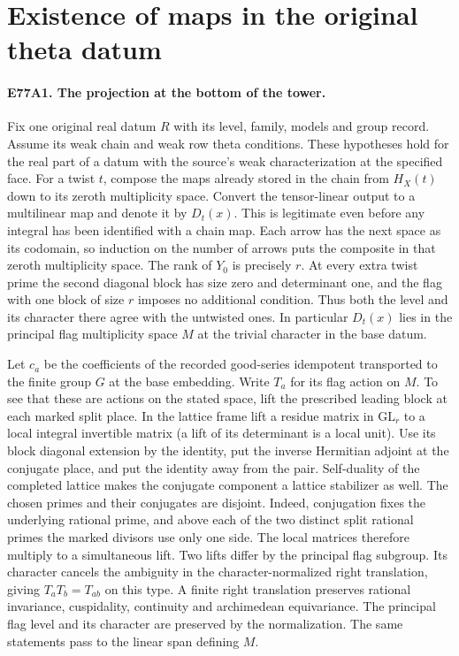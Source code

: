 \section{Existence of maps in the original theta datum}

\paragraph{E77A1. The projection at the bottom of the tower.}
Fix one original real datum $R$ with its level, family, models and
group record. Assume its weak chain and weak row theta conditions.
These hypotheses hold for the real part of a datum with the source's
weak characterization at the specified face. For a twist $t$, compose
the maps already stored in the chain from $H_X(t)$ down to its zeroth
multiplicity space. Convert the tensor-linear output to a multilinear
map and denote it by $D_t(x)$. This is legitimate even before any
integral has been identified with a chain map. Each arrow has the
next space as its codomain, so induction on the number of arrows puts
the composite in that zeroth multiplicity space. The rank of $Y_0$
is precisely $r$. At every extra twist prime the second diagonal
block has size zero and determinant one, and the flag with one block
of size $r$ imposes no additional condition. Thus both the level and
its character there agree with the untwisted ones. In particular
$D_t(x)$ lies in the principal flag multiplicity space $M$ at the
trivial character in the base datum.

Let $c_a$ be the coefficients of the recorded good-series idempotent
transported to the finite group $G$ at the base embedding. Write $T_a$
for its flag action on $M$. To see that these are actions on the stated
space, lift the prescribed leading block at each marked split place.
In the lattice frame lift a residue matrix in $\mathrm{GL}_r$ to a
local integral invertible matrix (a lift of its determinant is a local
unit). Use its block diagonal extension by the identity, put the
inverse Hermitian adjoint at the conjugate place, and put the identity
away from the pair. Self-duality of the completed lattice makes the
conjugate component a lattice stabilizer as well. The chosen primes
and their conjugates are disjoint. Indeed, conjugation fixes the
underlying rational prime, and above each of the two distinct split
rational primes the marked divisors use only one side. The local
matrices therefore multiply to a simultaneous lift. Two lifts differ
by the principal flag subgroup. Its character cancels the ambiguity
in the character-normalized right translation, giving $T_aT_b=T_{ab}$
on this type. A finite right translation preserves rational invariance,
cuspidality, continuity and archimedean equivariance. The principal
flag level and its character are preserved by the normalization.
The same statements pass to the linear span defining $M$.

